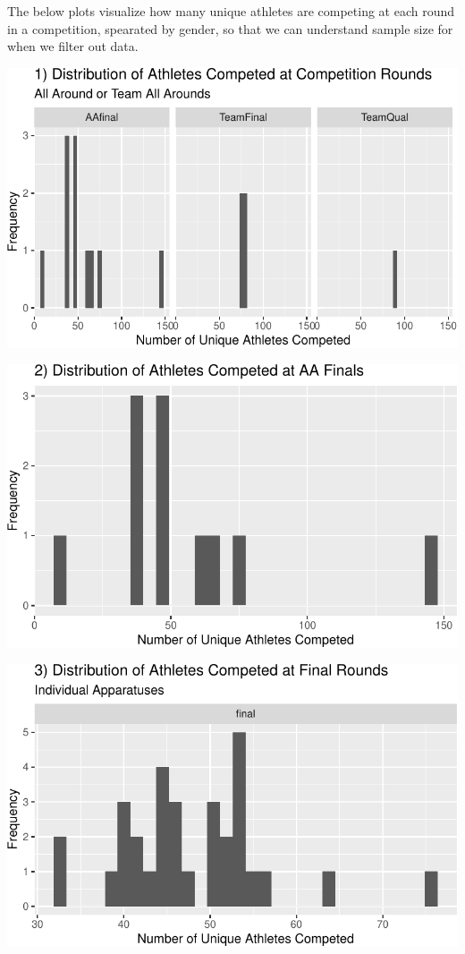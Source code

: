 \documentclass[
  10.5pt,
  letterpaper,
  DIV=11,
  numbers=noendperiod]{scrartcl}
\begin{document}
The below plots visualize how many unique athletes are competing at each
round in a competition, spearated by gender, so that we can understand
sample size for when we filter out data.

\includegraphics{Main_files/figure-pdf/unique-athletes-1.pdf}

\includegraphics{Main_files/figure-pdf/unique-athletes-2.pdf}

\includegraphics{Main_files/figure-pdf/unique-athletes-3.pdf}
\end{document}
